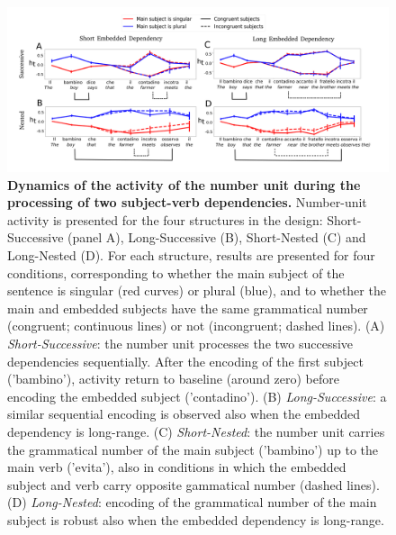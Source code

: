 \begin{figure}[ht]
    \centering
    \includegraphics[width=\textwidth, clip, trim={0mm 0mm 0mm 0mm}]{figures/model_activations_2by2.png}
    \caption{\textbf{Dynamics of the activity of the number unit during the processing of two subject-verb dependencies.} Number-unit activity is presented for the four structures in the design: Short-Successive (panel A), Long-Successive (B), Short-Nested (C) and Long-Nested (D). For each structure, results are presented for four conditions, corresponding to whether the main subject of the sentence is singular (red curves) or plural (blue), and to whether the main and embedded subjects have the same grammatical number (congruent; continuous lines) or not (incongruent; dashed lines). (A) \textit{Short-Successive}: the number unit processes the two successive dependencies sequentially. After the encoding of the first subject ('bambino'), activity return to baseline (around zero) before encoding the embedded subject ('contadino'). (B) \textit{Long-Successive}: a similar sequential encoding is observed also when the embedded dependency is long-range. (C) \textit{Short-Nested}: the number unit carries the grammatical number of the main subject ('bambino') up to the main verb ('evita'), also in conditions in which the embedded subject and verb carry opposite gammatical number (dashed lines). (D) \textit{Long-Nested}: encoding of the grammatical number of the main subject is robust also when the embedded dependency is long-range.}
    \label{fig:2by2_dynamics}
\end{figure}



